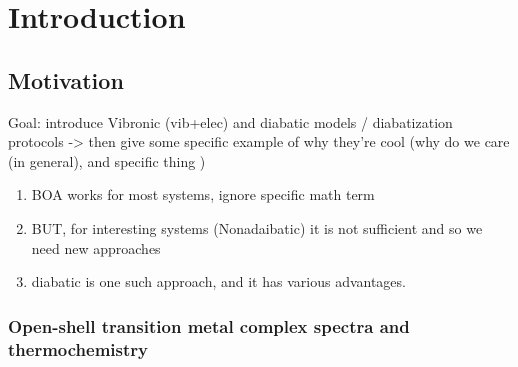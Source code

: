 \documentclass[letterpaper, 12pt, oneside]{report}
\newif\iffinalize
\newif\iffinalize
\begin{document}
\setcounter{page}{1}


\iffinalize \chapter{Introduction} 
\doublespace

\section{Motivation}


Goal: introduce Vibronic (vib+elec) and diabatic models / diabatization protocols -> then give some specific example of why they're cool
(why do we care (in general), and specific thing )
\begin{enumerate}
    \item BOA works for most systems, ignore specific math term
    \item BUT, for interesting systems (Nonadaibatic) it is not sufficient and so we need new approaches
    \item diabatic is one such approach, and it has various advantages.
\end{enumerate}


    \subsection{Open-shell transition metal complex spectra and thermochemistry}
    
\end{document}
